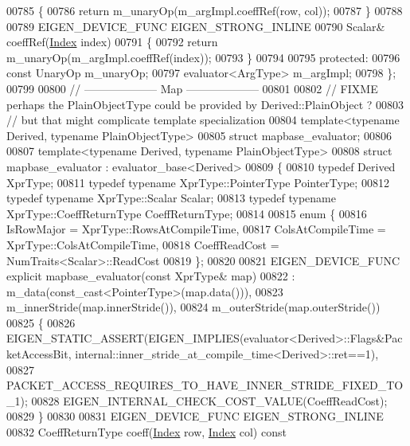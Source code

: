 \begin{DoxyCode}
00785   \{
00786     \textcolor{keywordflow}{return} m\_unaryOp(m\_argImpl.coeffRef(row, col));
00787   \}
00788 
00789   EIGEN\_DEVICE\_FUNC EIGEN\_STRONG\_INLINE
00790   Scalar& coeffRef(\hyperlink{namespace_eigen_a62e77e0933482dafde8fe197d9a2cfde}{Index} index)
00791   \{
00792     \textcolor{keywordflow}{return} m\_unaryOp(m\_argImpl.coeffRef(index));
00793   \}
00794 
00795 \textcolor{keyword}{protected}:
00796   \textcolor{keyword}{const} UnaryOp m\_unaryOp;
00797   evaluator<ArgType> m\_argImpl;
00798 \};
00799 
00800 \textcolor{comment}{// -------------------- Map --------------------}
00801 
00802 \textcolor{comment}{// FIXME perhaps the PlainObjectType could be provided by Derived::PlainObject ?}
00803 \textcolor{comment}{// but that might complicate template specialization}
00804 \textcolor{keyword}{template}<\textcolor{keyword}{typename} Derived, \textcolor{keyword}{typename} PlainObjectType>
00805 \textcolor{keyword}{struct }mapbase\_evaluator;
00806 
00807 \textcolor{keyword}{template}<\textcolor{keyword}{typename} Derived, \textcolor{keyword}{typename} PlainObjectType>
00808 \textcolor{keyword}{struct }mapbase\_evaluator : evaluator\_base<Derived>
00809 \{
00810   \textcolor{keyword}{typedef} Derived  XprType;
00811   \textcolor{keyword}{typedef} \textcolor{keyword}{typename} XprType::PointerType PointerType;
00812   \textcolor{keyword}{typedef} \textcolor{keyword}{typename} XprType::Scalar Scalar;
00813   \textcolor{keyword}{typedef} \textcolor{keyword}{typename} XprType::CoeffReturnType CoeffReturnType;
00814   
00815   \textcolor{keyword}{enum} \{
00816     IsRowMajor = XprType::RowsAtCompileTime,
00817     ColsAtCompileTime = XprType::ColsAtCompileTime,
00818     CoeffReadCost = NumTraits<Scalar>::ReadCost
00819   \};
00820 
00821   EIGEN\_DEVICE\_FUNC \textcolor{keyword}{explicit} mapbase\_evaluator(\textcolor{keyword}{const} XprType& map)
00822     : m\_data(const\_cast<PointerType>(map.data())),
00823       m\_innerStride(map.innerStride()),
00824       m\_outerStride(map.outerStride())
00825   \{
00826     EIGEN\_STATIC\_ASSERT(EIGEN\_IMPLIES(evaluator<Derived>::Flags&PacketAccessBit, 
      internal::inner\_stride\_at\_compile\_time<Derived>::ret==1),
00827                         PACKET\_ACCESS\_REQUIRES\_TO\_HAVE\_INNER\_STRIDE\_FIXED\_TO\_1);
00828     EIGEN\_INTERNAL\_CHECK\_COST\_VALUE(CoeffReadCost);
00829   \}
00830 
00831   EIGEN\_DEVICE\_FUNC EIGEN\_STRONG\_INLINE
00832   CoeffReturnType coeff(\hyperlink{namespace_eigen_a62e77e0933482dafde8fe197d9a2cfde}{Index} row, \hyperlink{namespace_eigen_a62e77e0933482dafde8fe197d9a2cfde}{Index} col)\textcolor{keyword}{ const}

\end{DoxyCode}
